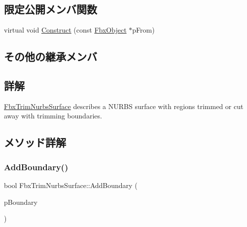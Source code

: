 \subsection*{限定公開メンバ関数}
\begin{DoxyCompactItemize}
\item 
virtual void \hyperlink{class_fbx_trim_nurbs_surface_a95ea54578a57e9038ae67cb2b6b26f82}{Construct} (const \hyperlink{class_fbx_object}{Fbx\+Object} $\ast$p\+From)
\end{DoxyCompactItemize}
\subsection*{その他の継承メンバ}


\subsection{詳解}
\hyperlink{class_fbx_trim_nurbs_surface}{Fbx\+Trim\+Nurbs\+Surface} describes a N\+U\+R\+BS surface with regions trimmed or cut away with trimming boundaries. 

\subsection{メソッド詳解}
\mbox{\label{class_fbx_trim_nurbs_surface_ab1b07cf42bbc5ac750aaed3012ebeec6}} 
\subsubsection{\texorpdfstring{Add\+Boundary()}{AddBoundary()}}
{\footnotesize\ttfamily bool Fbx\+Trim\+Nurbs\+Surface\+::\+Add\+Boundary (\begin{DoxyParamCaption}\item[{\hyperlink{class_fbx_boundary}{Fbx\+Boundary} $\ast$}]{p\+Boundary }\end{DoxyParamCaption})}

